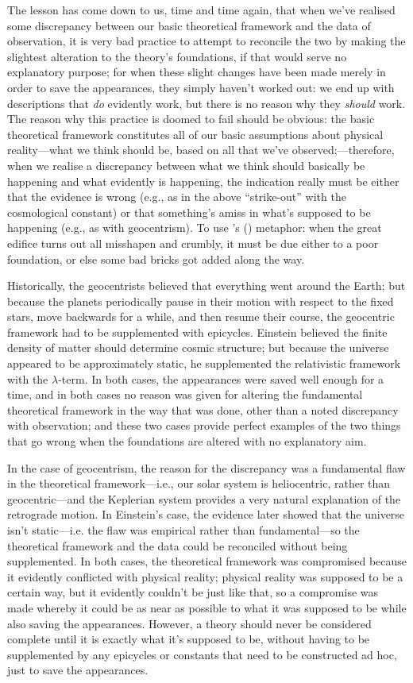 \documentclass[12 pt]{article}
\def\citeapos#1{\citeauthor{#1}'s (\citeyear{#1})}
\begin{document}
The lesson has come down to us, time and time again, that when we've realised some discrepancy between our basic theoretical framework and the data of observation, it is very bad practice to attempt to reconcile the two by making the slightest alteration to the theory's foundations, if that would serve no explanatory purpose; for when these slight changes have been made merely in order to save the appearances, they simply haven't worked out: we end up with descriptions that \textit{do} evidently work, but there is no reason why they \textit{should} work. The reason why this practice is doomed to fail should be obvious: the basic theoretical framework constitutes all of our basic assumptions about physical reality---what we think should be, based on all that we've observed;---therefore, when we realise a discrepancy between what we think should basically be happening and what evidently is happening, the indication really must be either that the evidence is wrong (e.g., as in the above ``strike-out'' with the cosmological constant) or that something's amiss in what's supposed to be happening (e.g., as with geocentrism). To use \citeapos{Forscher1963} metaphor: when the great edifice turns out all misshapen and crumbly, it must be due either to a poor foundation, or else some bad bricks got added along the way.

Historically, the geocentrists believed that everything went around the Earth; but because the planets periodically pause in their motion with respect to the fixed stars, move backwards for a while, and then resume their course, the geocentric framework had to be supplemented with epicycles. Einstein believed the finite density of matter should determine cosmic structure; but because the universe appeared to be approximately static, he supplemented the relativistic framework with the $\lambda$-term. In both cases, the appearances were saved well enough for a time, and in both cases no reason was given for altering the fundamental theoretical framework in the way that was done, other than a noted discrepancy with observation; and these two cases provide perfect examples of the two things that go wrong when the foundations are altered with no explanatory aim.

In the case of geocentrism, the reason for the discrepancy was a fundamental flaw in the theoretical framework---i.e., our solar system is heliocentric, rather than geocentric---and the Keplerian system provides a very natural explanation of the retrograde motion. In Einstein's case, the evidence later showed that the universe isn't static---i.e. the flaw was empirical rather than fundamental---so the theoretical framework and the data could be reconciled without being supplemented. In both cases, the theoretical framework was compromised because it evidently conflicted with physical reality; physical reality was supposed to be a certain way, but it evidently couldn't be just like that, so a compromise was made whereby it could be as near as possible to what it was supposed to be while also saving the appearances. However, a theory should never be considered complete until it is exactly what it's supposed to be, without having to be supplemented by any epicycles or constants that need to be constructed ad hoc, just to save the appearances.
\end{document}
